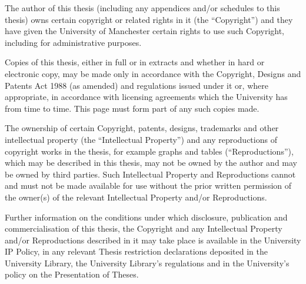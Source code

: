 \begin{Copyright}
    \begin{spacing}{1.25}
        The author of this thesis (including any appendices and/or schedules to this thesis) owns certain
        copyright or related rights in it (the ``Copyright'') and they have given the University of Manchester certain
        rights to use such Copyright, including for administrative purposes.
        
        Copies of this thesis, either in full or in extracts and whether in hard or electronic copy, may be made
        only in accordance with the Copyright, Designs and Patents Act 1988 (as amended) and regulations
        issued under it or, where appropriate, in accordance with licensing agreements which the University
        has from time to time. This page must form part of any such copies made.
        
        The ownership of certain Copyright, patents, designs, trademarks and other intellectual property (the
        ``Intellectual Property'') and any reproductions of copyright works in the thesis, for example graphs and
        tables (``Reproductions''), which may be described in this thesis, may not be owned by the author and
        may be owned by third parties. Such Intellectual Property and Reproductions cannot and must not be
        made available for use without the prior written permission of the owner(s) of the relevant Intellectual
        Property and/or Reproductions.

        Further information on the conditions under which disclosure, publication and commercialisation of this
        thesis, the Copyright and any Intellectual Property and/or Reproductions described in it may take place
        is available in the University IP Policy, in any relevant Thesis restriction declarations deposited in the
        University Library, the University Library's regulations and in the University's policy on the Presentation
        of Theses.
    \end{spacing}
\end{Copyright}